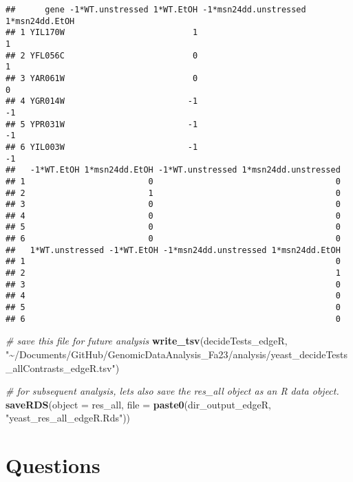 \documentclass[
]{book}
\newenvironment{Shaded}{\begin{snugshade}}{\end{snugshade}}
\newcommand{\AttributeTok}[1]{\textcolor[rgb]{0.13,0.29,0.53}{#1}}
\newcommand{\CommentTok}[1]{\textcolor[rgb]{0.56,0.35,0.01}{\textit{#1}}}
\newcommand{\FunctionTok}[1]{\textcolor[rgb]{0.13,0.29,0.53}{\textbf{#1}}}
\newcommand{\NormalTok}[1]{#1}
\newcommand{\StringTok}[1]{\textcolor[rgb]{0.31,0.60,0.02}{#1}}
\begin{document}
\begin{verbatim}
##      gene -1*WT.unstressed 1*WT.EtOH -1*msn24dd.unstressed 1*msn24dd.EtOH
## 1 YIL170W                          1                                    1
## 2 YFL056C                          0                                    1
## 3 YAR061W                          0                                    0
## 4 YGR014W                         -1                                   -1
## 5 YPR031W                         -1                                   -1
## 6 YIL003W                         -1                                   -1
##   -1*WT.EtOH 1*msn24dd.EtOH -1*WT.unstressed 1*msn24dd.unstressed
## 1                         0                                     0
## 2                         1                                     0
## 3                         0                                     0
## 4                         0                                     0
## 5                         0                                     0
## 6                         0                                     0
##   1*WT.unstressed -1*WT.EtOH -1*msn24dd.unstressed 1*msn24dd.EtOH
## 1                                                               0
## 2                                                               1
## 3                                                               0
## 4                                                               0
## 5                                                               0
## 6                                                               0
\end{verbatim}

\begin{Shaded}
\begin{Highlighting}[]
\CommentTok{\# save this file for future analysis}
\FunctionTok{write\_tsv}\NormalTok{(decideTests\_edgeR, }\StringTok{"\textasciitilde{}/Documents/GitHub/GenomicDataAnalysis\_Fa23/analysis/yeast\_decideTests\_allContrasts\_edgeR.tsv"}\NormalTok{)}

\CommentTok{\# for subsequent analysis, let\textquotesingle{}s also save the res\_all object as an R data object.}
\FunctionTok{saveRDS}\NormalTok{(}\AttributeTok{object =}\NormalTok{ res\_all, }\AttributeTok{file =} \FunctionTok{paste0}\NormalTok{(dir\_output\_edgeR, }\StringTok{"yeast\_res\_all\_edgeR.Rds"}\NormalTok{))}
\end{Highlighting}
\end{Shaded}

\hypertarget{questions-3}{%
\section{Questions}\label{questions-3}}
\end{document}
